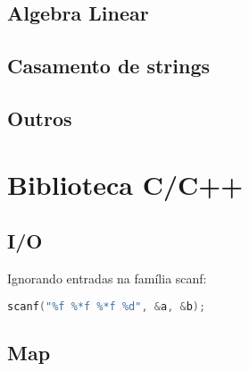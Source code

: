 \documentclass[a4paper,twocolumn, 10pt, landscape]{article}
\begin{document}
\subsection{Algebra Linear}


\subsection{Casamento de strings}


\subsection{Outros}





\section{Biblioteca C/C++}
\subsection{I/O}
Ignorando entradas na família scanf:
\begin{lstlisting}[language=c, label=cio, caption={Ignora os dois floats do meio. Retornará 2 no sucesso.}]
 scanf("%f %*f %*f %d", &a, &b);
\end{lstlisting}


\subsection{Map}

\end{document}
